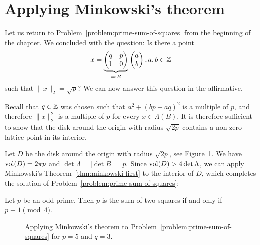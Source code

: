\section{Applying Minkowski's theorem}

Let us return to Problem~\ref{problem:prime-sum-of-squares} from the beginning of the chapter.
We concluded with the question: Is there a point
\[
  x =
  \underbrace{\begin{pmatrix}
    q & p \\
    1 & 0
  \end{pmatrix}}_{=: B}
  \begin{pmatrix}
    a \\ b
  \end{pmatrix},
  a, b \in \mathbb{Z}
\]
such that $\|x\|_2 = \sqrt{p}$?
We can now answer this question in the affirmative.

Recall that $q \in \mathbb{Z}$ was chosen such that $a^2 + (bp + aq)^2$ is a multiple of $p$,
and therefore $\|x\|_2^2$ is a multiple of $p$ for every $x \in \Lambda(B)$.
It is therefore sufficient to show that the disk around the origin with radius $\sqrt{2p}$
contains a non-zero lattice point in its interior.

Let $D$ be the disk around the origin with radius $\sqrt{2p}$, see Figure~\ref{fig:prime-sum-of-squares}.
We have $\operatorname{vol}(D) = 2\pi p$ and $\det \Lambda = |\det B| = p$.
Since $\operatorname{vol}(D) > 4 \det \Lambda$,
we can apply Minkowski's Theorem~\ref{thm:minkowski-first}
to the interior of $D$,
which completes the solution of Problem~\ref{problem:prime-sum-of-squares}:
\begin{theorem}
  Let $p$ be an odd prime.
  Then $p$ is the sum of two squares if and only if $p \equiv 1 \pmod{4}$.
\end{theorem}

\begin{figure}
  \begin{center}
  \end{center}
  \caption{Applying Minkowski's theorem to Problem~\ref{problem:prime-sum-of-squares} for $p = 5$ and $q = 3$.}
  \label{fig:prime-sum-of-squares}
\end{figure}


